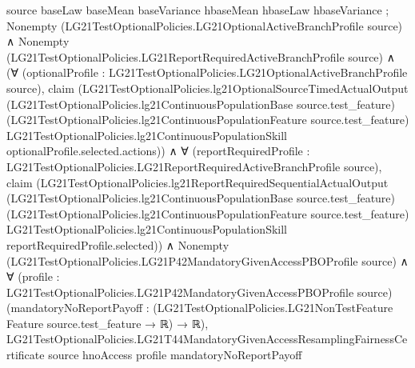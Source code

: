 \documentclass[10pt]{article}
\begin{document}
\begin{ReviewVerbatim}
{                  source baseLaw baseMean baseVariance hbaseMean hbaseLaw hbaseVariance };
    Nonempty (LG21TestOptionalPolicies.LG21OptionalActiveBranchProfile source) ∧
      Nonempty (LG21TestOptionalPolicies.LG21ReportRequiredActiveBranchProfile source) ∧
        (∀ (optionalProfile : LG21TestOptionalPolicies.LG21OptionalActiveBranchProfile source),
            claim
              (LG21TestOptionalPolicies.lg21OptionalSourceTimedActualOutput
                (LG21TestOptionalPolicies.lg21ContinuousPopulationBase source.test_feature)
                (LG21TestOptionalPolicies.lg21ContinuousPopulationFeature source.test_feature)
                LG21TestOptionalPolicies.lg21ContinuousPopulationSkill optionalProfile.selected.actions)) ∧
          ∀ (reportRequiredProfile : LG21TestOptionalPolicies.LG21ReportRequiredActiveBranchProfile source),
            claim
              (LG21TestOptionalPolicies.lg21ReportRequiredSequentialActualOutput
                (LG21TestOptionalPolicies.lg21ContinuousPopulationBase source.test_feature)
                (LG21TestOptionalPolicies.lg21ContinuousPopulationFeature source.test_feature)
                LG21TestOptionalPolicies.lg21ContinuousPopulationSkill reportRequiredProfile.selected)) ∧
    Nonempty (LG21TestOptionalPolicies.LG21P42MandatoryGivenAccessPBOProfile source) ∧
      ∀ (profile : LG21TestOptionalPolicies.LG21P42MandatoryGivenAccessPBOProfile source)
        (mandatoryNoReportPayoff : (LG21TestOptionalPolicies.LG21NonTestFeature Feature source.test_feature → ℝ) → ℝ),
        LG21TestOptionalPolicies.LG21T44MandatoryGivenAccessResamplingFairnessCertificate source hnoAccess profile
          mandatoryNoReportPayoff
\end{ReviewVerbatim}
\end{document}
